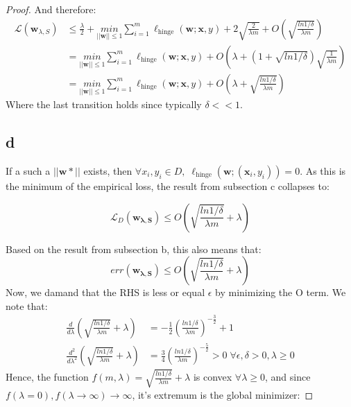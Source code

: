 \begin{proof}
    And therefore:
    \begin{equation*}
        \begin{split}      
            \mathcal{L}(\boldsymbol{w}_{\lambda, S}) &\leq \frac{\lambda}{2} + \underset{||\boldsymbol{w}||\leq 1}{min} \sum_{i=1}^m \ell_{\text{hinge}}(\boldsymbol{w}; \boldsymbol{x}, y) + 2 \sqrt{\frac{2}{\lambda m}} + O\left(\sqrt{\frac{ln 1/\delta}{\lambda m}} \right) \\
            &= \underset{||\boldsymbol{w}||\leq 1}{min} \sum_{i=1}^m \ell_{\text{hinge}}(\boldsymbol{w}; \boldsymbol{x}, y) + O\left(\lambda + \left(1 + \sqrt{ln 1/\delta}\right)\sqrt{\frac{1}{\lambda m}} \right) \\
            &= \underset{||\boldsymbol{w}||\leq 1}{min} \sum_{i=1}^m \ell_{\text{hinge}}(\boldsymbol{w}; \boldsymbol{x}, y) + O\left(\lambda + \sqrt{\frac{ln 1/\delta}{\lambda m}} \right)
        \end{split}
    \end{equation*}
    Where the last transition holds since typically $\delta << 1$.

\subsection*{d}
If a such a $||\boldsymbol{w*}||$ exists, then $\forall x_i, y_i \in D, \; \ell_{\text{hinge}}(\boldsymbol{w};(\boldsymbol{x}_i, y_i)) = 0 $. As this is the minimum of the empirical loss, the result from subsection c collapses to:

\begin{equation*}
    \mathcal{L}_D(\boldsymbol{w_{\lambda, S}}) \leq O\left(\sqrt{\frac{ln 1/\delta}{\lambda m}} + \lambda \right)
\end{equation*}

Based on the result from subsection b, this also means that:
\begin{equation*}
    err(\boldsymbol{w_{\lambda, S}}) \leq O\left(\sqrt{\frac{ln 1/\delta}{\lambda m}} + \lambda \right)
\end{equation*}
Now, we damand that the RHS is less or equal $\epsilon$ by minimizing the O term.
We note that:
\begin{equation*}
    \begin{split}
        \frac{d}{d\lambda} \left(\sqrt{\frac{ln 1/\delta}{\lambda m}} + \lambda\right) &= -\frac{1}{2} (\frac{ln 1/\delta}{\lambda m})^{-\frac{3}{2}} + 1 \\
        \frac{d^2}{d\lambda^2} \left(\sqrt{\frac{ln 1/\delta}{\lambda m}} + \lambda\right) &= 
        \frac{3}{4} (\frac{ln 1/\delta}{\lambda m})^{-\frac{5}{2}} > 0 \; \forall \epsilon, \delta > 0, \lambda \geq 0
    \end{split}
\end{equation*}
Hence, the function $f(m, \lambda) = \sqrt{\frac{ln 1/\delta}{\lambda m}} + \lambda$ is convex $\forall \lambda \geq 0$, and since $f(\lambda=0), f(\lambda \rightarrow \infty) \rightarrow \infty$, it's extremum is the global minimizer:


\end{proof}
